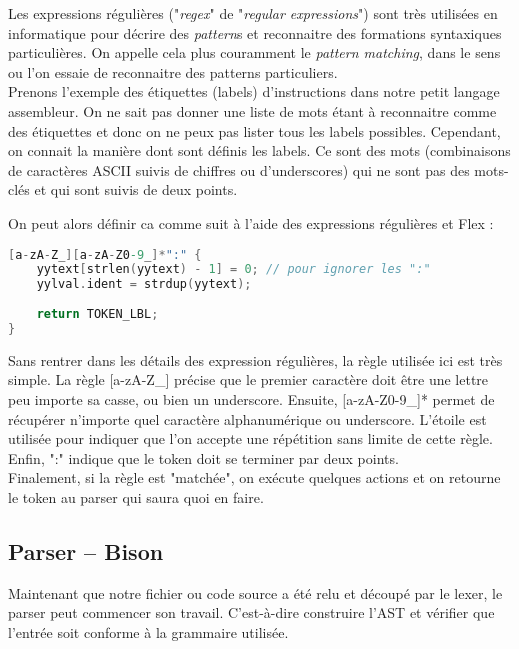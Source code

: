 \documentclass[14pt,a4paper]{article}
\begin{document}
	Les expressions régulières ("\textit{regex}" de "\textit{regular expressions}") sont très utilisées en informatique pour décrire des \textit{pattern}s et reconnaitre des formations syntaxiques particulières. On appelle cela plus couramment le \textit{pattern matching}, dans le sens ou l'on essaie de reconnaitre des patterns particuliers.\\
	
	Prenons l'exemple des étiquettes (labels) d'instructions dans notre petit langage assembleur. On ne sait pas donner une liste de mots étant à reconnaitre comme des étiquettes et donc on ne peux pas lister tous les labels possibles. Cependant, on connait la manière dont sont définis les labels. Ce sont des mots (combinaisons de caractères ASCII suivis de chiffres ou d'underscores) qui ne sont pas des mots-clés et qui sont suivis de deux points.
	
	On peut alors définir ca comme suit à l'aide des expressions régulières et Flex :
	
	\begin{lstlisting}[frame=simple,language=C]
[a-zA-Z_][a-zA-Z0-9_]*":" {
	yytext[strlen(yytext) - 1] = 0; // pour ignorer les ":"
	yylval.ident = strdup(yytext);
	
	return TOKEN_LBL;
}
	\end{lstlisting}
	
	Sans rentrer dans les détails des expression régulières, la règle utilisée ici est très simple. La règle [a-zA-Z\_] précise que le premier caractère doit être une lettre peu importe sa casse, ou bien un underscore. Ensuite, [a-zA-Z0-9\_]* permet de récupérer n'importe quel caractère alphanumérique ou underscore. L'étoile est utilisée pour indiquer que l'on accepte une répétition sans limite de cette règle. Enfin, ":" indique que le token doit se terminer par deux points.\\
	
	Finalement, si la règle est "matchée", on exécute quelques actions et on retourne le token au parser qui saura quoi en faire.
	
	\subsection{Parser -- Bison}
	
	Maintenant que notre fichier ou code source a été relu et découpé par le lexer, le parser peut commencer son travail. C'est-à-dire construire l'AST et vérifier que l'entrée soit conforme à la grammaire utilisée.\\
	
\end{document}
